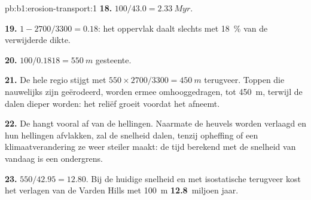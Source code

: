 \begin{solution}{pb:b1:erosion-transport:1}
\textbf{18.} $100/43.0 = \qty{2.33}{Myr}$.

\textbf{19.} $1 - 2700/3300 = 0.18$: het oppervlak daalt slechts met
\qty{18}{\percent} van de verwijderde dikte.

\textbf{20.} $100/0.1818 = \qty{550}{m}$ gesteente.

\textbf{21.} De hele regio stijgt met $550 \times 2700/3300 = \qty{450}{m}$ terugveer.
Toppen die nauwelijks zijn geërodeerd, worden ermee omhooggedragen, tot
\qty{450}{m}, terwijl de dalen dieper worden: het reliëf groeit voordat het afneemt.

\textbf{22.} De  hangt vooral af van de hellingen. Naarmate de heuvels
worden verlaagd en hun hellingen afvlakken, zal de snelheid dalen, tenzij opheffing of een
klimaatverandering ze weer steiler maakt: de tijd berekend met de snelheid van vandaag is
een ondergrens.

\textbf{23.} $550/42.95 = 12.80$. Bij de huidige snelheid en met isostatische terugveer
kost het verlagen van de Varden Hills met \qty{100}{m} \textbf{12.8}~miljoen jaar.
\end{solution}

